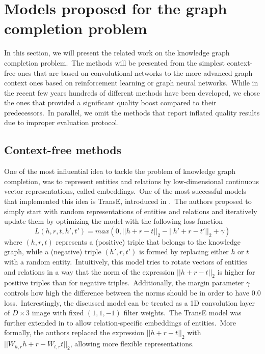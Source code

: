 \documentclass[longabstract, english, mgr]{iithesis}
\theoremstyle{default_theorem_style}\newtheorem{theorem}{Theorem}
\theoremstyle{default_theorem_style}\newtheorem{definition}{Definition}
\begin{document}
\section{Models proposed for the graph completion problem}\label{sec:background_models}

In this section, we will present the related work on the knowledge graph completion problem.\ The methods will be
presented from the simplest context-free ones that are based on convolutional networks to the more advanced
graph-context ones based on reinforcement learning or graph neural networks.\ While in the recent few years hundreds of
different methods have been developed, we chose the ones that provided a significant quality boost compared to their
predecessors.\ In parallel, we omit the methods that report inflated quality results due to improper evaluation
protocol.

\subsection{Context-free methods}

One of the most influential idea to tackle the problem of knowledge graph completion, was to represent entities and
relations by low-dimensional continuous vector representations, called embeddings.\ One of the most successful models
that implemented this idea is TransE, introduced in \cite{transe_model}.\ The authors proposed to simply
start with random representations of entities and relations and iteratively update them by optimizing the model
with the following loss function
$$
L(h, r, t, h', t') = max(0, ||h + r - t||_2 - ||h' + r - t'||_2 + \gamma)
$$
where $(h, r, t)$ represents a (positive) triple that belongs to the knowledge graph, while a (negative) triple
$(h', r, t')$ is formed by replacing either $h$ or $t$ with a random entity.\ Intuitively, this model tries to
rotate vectors of entities and relations in a way that the norm of the expression $||h + r - t||_2$ is higher for
positive triples than for negative triples.\ Additionally, the margin parameter $\gamma$ controls how high the
difference between the norms should be in order to have $0.0$ loss.\ Interestingly, the discussed model can be treated
as a 1D convolution layer of $D \times 3$ image with fixed $(1, 1, -1)$ filter weights.\ The TransE model was
further extended in \cite{stranse_model} to allow relation-specific embeddings of entities.\ More formally, the
authors replaced the expression $||h + r - t||_2$ with $||W_{h,r} h + r - W_{t,r} t||_2$, allowing more flexible
representations.\newline
\end{document}

